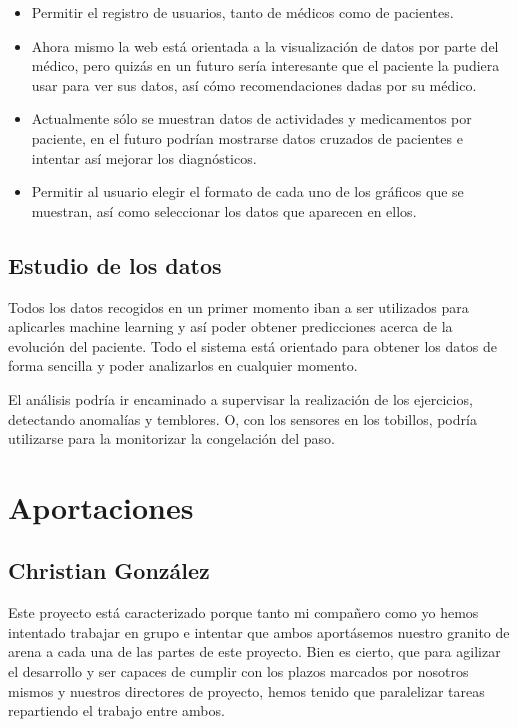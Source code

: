 \documentclass[11pt,spanish]{article}
\begin{document}
\begin{itemize}
	\item Permitir el registro de usuarios, tanto de médicos como de pacientes.
    \item Ahora mismo la web está orientada a la visualización de datos por parte del médico, pero quizás en un futuro sería interesante que el paciente la pudiera usar para ver sus datos, así cómo recomendaciones dadas por su médico.
    \item Actualmente sólo se muestran datos de actividades y medicamentos por paciente, en el futuro podrían mostrarse datos cruzados de pacientes e intentar así mejorar los diagnósticos.
    \item Permitir al usuario elegir el formato de cada uno de los gráficos que se muestran, así como seleccionar los datos que aparecen en ellos.
\end{itemize}

\subsection{Estudio de los datos}
Todos los datos recogidos en un primer momento iban a ser utilizados para aplicarles machine learning y así poder obtener predicciones acerca de la evolución del paciente. Todo el sistema está orientado para obtener los datos de forma sencilla y poder analizarlos en cualquier momento.
\newline

El análisis podría ir encaminado a supervisar la realización de los ejercicios, detectando anomalías y temblores. O, con los sensores en los tobillos, podría utilizarse para la monitorizar la congelación del paso.
\newpage

\section{Aportaciones}
\subsection{Christian González}

Este proyecto está caracterizado porque tanto mi compañero como yo hemos intentado trabajar en grupo e intentar que ambos aportásemos nuestro granito de arena a cada una de las partes de este proyecto. Bien es cierto, que para agilizar el desarrollo y ser capaces de cumplir con los plazos marcados por nosotros mismos y nuestros directores de proyecto, hemos tenido que paralelizar tareas repartiendo el trabajo entre ambos.
\newline
\end{document}
